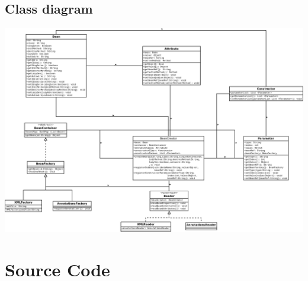 \documentclass[a4paper, 12pt, notitlepage]{report}
\begin{document}
\section{Class diagram}
%
\includegraphics[scale=0.25]{images/ioc.png}

\newpage
%



\appendix
\chapter{Source Code}
























\end{document}
